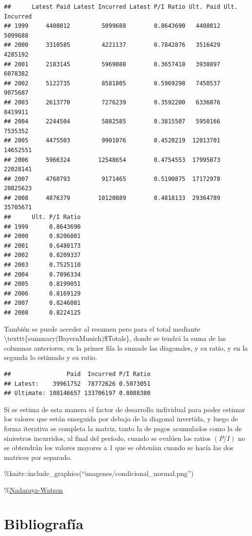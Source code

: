 \documentclass[
  12pt,
]{article}
\begin{document}
\begin{verbatim}
##      Latest Paid Latest Incurred Latest P/I Ratio Ult. Paid Ult. Incurred
## 1999     4408012         5099688        0.8643690   4408012       5099688
## 2000     3310585         4221137        0.7842876   3516429       4285192
## 2001     2183145         5969088        0.3657418   3938897       6078382
## 2002     5122735         8581805        0.5969298   7450537       9075687
## 2003     2613770         7276239        0.3592200   6336076       8419911
## 2004     2244504         5882585        0.3815507   5950166       7535352
## 2005     4475503         9901076        0.4520219  12013701      14652551
## 2006     5966324        12548654        0.4754553  17995073      22028141
## 2007     4760793         9171465        0.5190875  17172978      20825623
## 2008     4876379        10120889        0.4818133  29364789      35705671
##      Ult. P/I Ratio
## 1999      0.8643690
## 2000      0.8206001
## 2001      0.6480173
## 2002      0.8209337
## 2003      0.7525110
## 2004      0.7896334
## 2005      0.8199051
## 2006      0.8169129
## 2007      0.8246081
## 2008      0.8224125
\end{verbatim}

También se puede acceder al resumen pero para el total mediante
\textbackslash texttt\{summary(BayernMunich)\$Totals\}, donde se tendrá
la suma de las columnas anteriores, en la primer fila la sumade las
diagonales, y su ratio, y en la segunda lo estimado y su ratio.

\begin{verbatim}
##                Paid  Incurred P/I Ratio
## Latest:    39961752  78772626 0.5073051
## Ultimate: 108146657 133706197 0.8088380
\end{verbatim}

Si se estima de esta manera el factor de desarrollo individual para
poder estimar los valores que están enseguida por debajo de la diagonal
invertida, y luego de forma iterativa se completa la matriz, tanto la de
pagos acumulados como la de siniestros incurridos, al final del período,
cuando se evalúen los ratios \((P/I)\) no se obtendrán los valores
mayores a 1 que se obtenían cuando se hacía las dos matrices por
separado.

\%knitr::include\_graphics(``imagenes/condicional\_normal.png'')

\%\protect\hyperlink{bib}{Nadaraya-Watson}

\newpage

\hypertarget{bib}{%
\section*{Bibliografía}\label{bib}}
\end{document}

